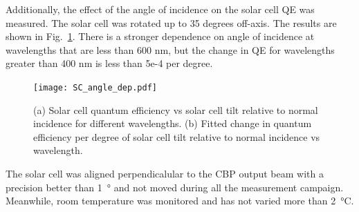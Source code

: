 Additionally, the effect of the angle of incidence on the solar cell QE was measured. The solar cell was rotated up to 35 degrees off-axis. The results are shown in Fig.~\ref{fig:SC_angle}. There is a stronger dependence on angle of incidence at wavelengths that are less than 600 nm, but the change in QE for wavelengths greater than 400 nm is less than 5e-4 per degree.
\begin{figure}[!h]
\centering
\texttt{[image: SC\_angle\_dep.pdf]}
\caption{(a) Solar cell quantum efficiency vs solar cell tilt relative to normal incidence for different wavelengths. (b) Fitted change in quantum efficiency per degree of solar cell tilt relative to normal incidence vs wavelength.}
\label{fig:SC_angle}
\end{figure}

The solar cell was aligned perpendicalular to the CBP output beam with a precision better than \SI{1}{\degree} and not moved during all the measurement campaign. Meanwhile, room temperature was monitored and has not varied more than \SI{2}{\degreeCelsius}.

%


